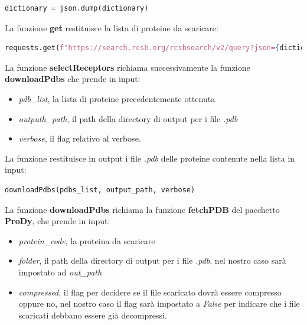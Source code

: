 \begin{lstlisting}[language=Python, label=lst:code15, caption={funzione json.dump}]
dictionary = json.dump(dictionary)
\end{lstlisting}

La funzione \textbf{get} restituisce la lista di proteine da scaricare:

\begin{lstlisting}[language=Python, label=lst:code16, caption={funzione requests.get}]
requests.get(f"https://search.rcsb.org/rcsbsearch/v2/query?json={dictionary}")
\end{lstlisting}

La funzione \textbf{selectReceptors} richiama successivamente la funzione \textbf{downloadPdbs} che prende in input:

\begin{itemize}
    \item \textit{pdb\_list}, la lista di proteine precedentemente ottenuta
    \item \textit{outputh\_path}, il path della directory di output per i file \textit{.pdb}
    \item \textit{verbose}, il flag relativo al verbose.
\end{itemize}

La funzione restituisce in output i file \textit{.pdb} delle proteine contenute nella lista in input:

\begin{lstlisting}[language=Python, label=lst:code17, caption={funzione downloadPdbs}]
downloadPdbs(pdbs_list, output_path, verbose)
\end{lstlisting}

La funzione \textbf{downloadPdbs} richiama la funzione \textbf{fetchPDB} del pacchetto \textbf{ProDy}, che prende in input:

\begin{itemize}
    \item \textit{protein\_code}, la proteina da scaricare
    \item \textit{folder}, il path della directory di output per i file \textit{.pdb}, nel nostro caso sarà impostato ad \textit{out\_path}
    \item \textit{compressed}, il flag per decidere se il file scaricato dovrà essere compresso oppure no, nel nostro caso il flag sarà impostato a \textit{False} per indicare che i file scaricati debbano essere già decompressi.
\end{itemize}

